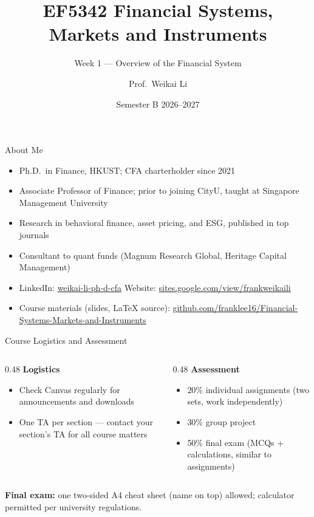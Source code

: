 \documentclass[aspectratio=169]{beamer}
\title{EF5342 Financial Systems, Markets and Instruments}
\subtitle{Week 1 --- Overview of the Financial System}
\author{Prof.\ Weikai Li}
\institute{City University of Hong Kong}
\date{Semester B 2026--2027}
\begin{document}

\begin{frame}
\titlepage
\end{frame}

\begin{frame}{About Me}
\begin{itemize}
  \item Ph.D.\ in Finance, HKUST; CFA charterholder since 2021
  \item Associate Professor of Finance; prior to joining CityU, taught at Singapore Management University
  \item Research in behavioral finance, asset pricing, and ESG, published in top journals
  \item Consultant to quant funds (Magnum Research Global, Heritage Capital Management)
  \item LinkedIn: \href{https://www.linkedin.com/in/weikai-li-ph-d-cfa-9aa65231/}{weikai-li-ph-d-cfa}
  \quad Website: \href{https://sites.google.com/view/frankweikaili/home}{sites.google.com/view/frankweikaili}
  \item Course materials (slides, LaTeX source): \href{https://github.com/franklee16/Financial-Systems-Markets-and-Instruments}{github.com/franklee16/Financial-Systems-Markets-and-Instruments}
\end{itemize}
\end{frame}

\begin{frame}{Course Logistics and Assessment}
\begin{columns}
\begin{column}{0.48\textwidth}
\textbf{Logistics}
\begin{itemize}
  \item Check Canvas regularly for announcements and downloads
  \item One TA per section --- contact your section's TA for all course matters
\end{itemize}
\end{column}
\begin{column}{0.48\textwidth}
\textbf{Assessment}
\begin{itemize}
  \item 20\% individual assignments (two sets, work independently)
  \item 30\% group project
  \item 50\% final exam (MCQs + calculations, similar to assignments)
\end{itemize}
\end{column}
\end{columns}
\vspace{0.8em}
\textbf{Final exam:} one two-sided A4 cheat sheet (name on top) allowed; calculator permitted per university regulations.
\end{frame}
\end{document}
